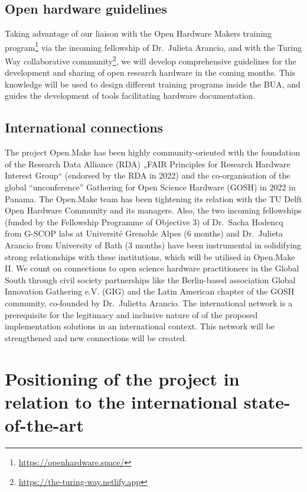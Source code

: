 \documentclass[
  12pt,
  a4paper,
]{article}
\begin{document}
\hypertarget{open-hardware-guidelines}{%
\subsection{Open hardware guidelines}\label{open-hardware-guidelines}}

Taking advantage of our liaison with the Open Hardware Makers training
program\footnote{\url{https://openhardware.space/}} via the incoming
fellowship of Dr.~Julieta Arancio, and with the Turing Way collaborative
community\footnote{\url{https://the-turing-way.netlify.app}}, we will
develop comprehensive guidelines for the development and sharing of open
research hardware in the coming months. This knowledge will be used to
design different training programs inside the BUA, and guides the
development of tools facilitating hardware documentation.

\hypertarget{international-connections}{%
\subsection{International connections}\label{international-connections}}

The project Open.Make has been highly community-oriented with the
foundation of the Research Data Alliance (RDA) „FAIR Principles for
Research Hardware Interest Group`` (endorsed by the RDA in 2022) and the
co-organisation of the global ``unconference'' Gathering for Open
Science Hardware (GOSH) in 2022 in Panama. The Open.Make team has been
tightening its relation with the TU Delft Open Hardware Community and
its managers. Also, the two incoming fellowships (funded by the
Fellowship Programme of Objective 3) of Dr.~Sacha Hodencq from G-SCOP
labs at Université Grenoble Alpes (6 months) and Dr.~Julieta Arancio
from University of Bath (3 months) have been instrumental in solidifying
strong relationships with these institutions, which will be utilised in
Open.Make II. We count on connections to open science hardware
practitioners in the Global South through civil society partnerships
like the Berlin-based association Global Innovation Gathering e.V. (GIG)
and the Latin American chapter of the GOSH community, co-founded by
Dr.~Julietta Arancio. The international network is a prerequisite for
the legitimacy and inclusive nature of of the proposed implementation
solutions in an international context. This network will be strengthened
and new connections will be created.

\hypertarget{positioning-of-the-project-in-relation-to-the-international-state-of-the-art}{%
\section{Positioning of the project in relation to the international
state-of-the-art}\label{positioning-of-the-project-in-relation-to-the-international-state-of-the-art}}
\end{document}
